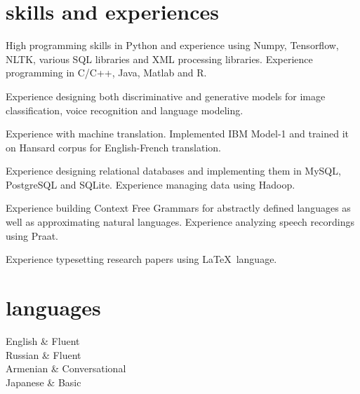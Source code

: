 \documentclass[]{cv-roald}
\begin{document}
\section*{skills and experiences}
\begin{tabitemize}
    \item High programming skills in Python and experience using Numpy, Tensorflow, NLTK, various SQL libraries and XML processing libraries. Experience programming in C/C++, Java, Matlab and R.
    \item Experience designing both discriminative and generative models for image classification, voice recognition and language modeling.
    \item Experience with machine translation. Implemented IBM Model-1 and trained it on Hansard corpus for English-French translation.
    \item Experience designing relational databases and implementing them in MySQL, PostgreSQL and SQLite. Experience managing data using Hadoop.
    \item Experience building Context Free Grammars for abstractly defined languages as well as approximating natural languages. Experience analyzing speech recordings using Praat.
    \item Experience typesetting research papers using \LaTeX\ language.
\end{tabitemize}

\section*{languages}
\begin{tabularcv}
    English			&	Fluent \\[\vspacepar]
    Russian			&	Fluent \\[\vspacepar]
    Armenian		&	Conversational \\[\vspacepar]
    Japanese        &   Basic
\end{tabularcv}
\end{document}
